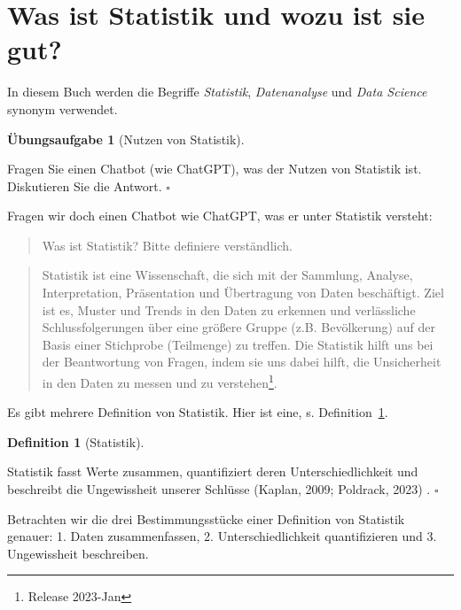 \documentclass[
  letterpaper,
  twoside,
  open=any]{scrbook}
\theoremstyle{definition}
\newtheorem{definition}{Definition}[chapter]
\theoremstyle{definition}
\newtheorem{exercise}{Übungsaufgabe}[chapter]
\theoremstyle{definition}
\theoremstyle{remark}
\begin{document}
\section{Was ist Statistik und wozu ist sie
gut?}\label{was-ist-statistik-und-wozu-ist-sie-gut}

In diesem Buch werden die Begriffe \emph{Statistik}, \emph{Datenanalyse}
und \emph{Data Science} synonym verwendet.

\begin{exercise}[Nutzen von
Statistik]\protect\hypertarget{exr-nutzen-statistik}{}\label{exr-nutzen-statistik}

Fragen Sie einen Chatbot (wie ChatGPT), was der Nutzen von Statistik
ist. Diskutieren Sie die Antwort. \(\square\)

\end{exercise}

Fragen wir doch einen Chatbot wie ChatGPT, was er unter Statistik
versteht:

\begin{quote}
{} Was ist Statistik? Bitte definiere verständlich.
\end{quote}

\begin{quote}
{} Statistik ist eine Wissenschaft, die sich mit der
Sammlung, Analyse, Interpretation, Präsentation und Übertragung von
Daten beschäftigt. Ziel ist es, Muster und Trends in den Daten zu
erkennen und verlässliche Schlussfolgerungen über eine größere Gruppe
(z.B. Bevölkerung) auf der Basis einer Stichprobe (Teilmenge) zu
treffen. Die Statistik hilft uns bei der Beantwortung von Fragen, indem
sie uns dabei hilft, die Unsicherheit in den Daten zu messen und zu
verstehen\footnote{Release 2023-Jan}.
\end{quote}

Es gibt mehrere Definition von Statistik. Hier ist eine, s.
Definition~\ref{def-statistik}.

\begin{definition}[Statistik]\protect\hypertarget{def-statistik}{}\label{def-statistik}

Statistik fasst Werte zusammen, quantifiziert deren Unterschiedlichkeit
und beschreibt die Ungewissheit unserer Schlüsse (Kaplan, 2009;
Poldrack, 2023) . \(\square\)

\end{definition}

Betrachten wir die drei Bestimmungsstücke einer Definition von Statistik
genauer: 1. Daten zusammenfassen, 2. Unterschiedlichkeit quantifizieren
und 3. Ungewissheit beschreiben.
\end{document}
